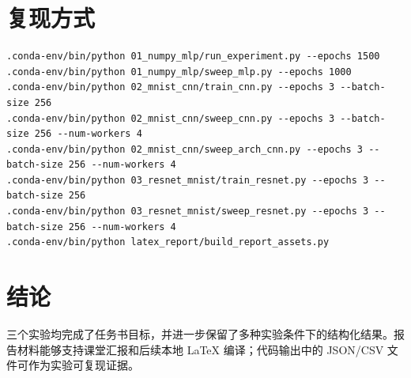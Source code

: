 \documentclass[UTF8]{ctexart}
\begin{document}
\section{复现方式}
\begin{verbatim}
.conda-env/bin/python 01_numpy_mlp/run_experiment.py --epochs 1500
.conda-env/bin/python 01_numpy_mlp/sweep_mlp.py --epochs 1000
.conda-env/bin/python 02_mnist_cnn/train_cnn.py --epochs 3 --batch-size 256
.conda-env/bin/python 02_mnist_cnn/sweep_cnn.py --epochs 3 --batch-size 256 --num-workers 4
.conda-env/bin/python 02_mnist_cnn/sweep_arch_cnn.py --epochs 3 --batch-size 256 --num-workers 4
.conda-env/bin/python 03_resnet_mnist/train_resnet.py --epochs 3 --batch-size 256
.conda-env/bin/python 03_resnet_mnist/sweep_resnet.py --epochs 3 --batch-size 256 --num-workers 4
.conda-env/bin/python latex_report/build_report_assets.py
\end{verbatim}

\section{结论}
三个实验均完成了任务书目标，并进一步保留了多种实验条件下的结构化结果。报告材料能够支持课堂汇报和后续本地 LaTeX 编译；代码输出中的 JSON/CSV 文件可作为实验可复现证据。
\end{document}
